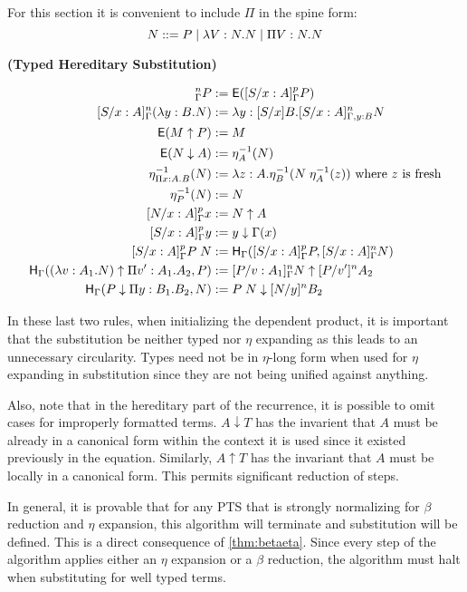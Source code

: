 For this section it is convenient to include $\Pi$ in the spine form: 
\[
N ::= P 
\; | \; \lambda V : N . N 
\; | \; \Pi V : N . N 
\]


\begin{definition}
\textbf{(Typed Hereditary Substitution)}

\begin{align}
[S / x : A]^n_{\Gamma } P &:= \m{E}([S / x : A]^p_{\Gamma } P)
\\
[S / x : A]^n_{\Gamma } (\lambda y : B . N) &:= \lambda y: [S / x ] B. [S / x : A]^n_{\Gamma, y : B} N
\\
\m{E}(M \uparrow P) &:= M
\\
\m{E}(N \downarrow A) &:= \eta^{-1}_A (N)
\\
\eta^{-1}_{\Pi x : A . B}(N) &:= \lambda z : A . \eta^{-1}_B(N \; \eta^{-1}_A(z))
 \text{ where $z$ is fresh}
\\
\eta^{-1}_{P}(N) &:= N
\\
[ N / x : A]^p_{\Gamma} x &:= N \uparrow A
\\
[S / x : A]^p_{\Gamma} y &:= y \downarrow \Gamma(x)
\\
[S / x : A]^p_{\Gamma } P\;N &:= 
\m{H}_{\Gamma} ( [S/x : A]^p_{\Gamma} P , [S/x : A]^n_{\Gamma} N) 
\\
\m{H}_{\Gamma} ((\lambda v : A_1 . N) \uparrow \Pi v' : A_1 . A_2 , P) 
&:= [P/v : A_1]^n_{\Gamma} N \uparrow [P/v']^n A_2
\\
\m{H}_{\Gamma}(P \downarrow \Pi y : B_1 . B_2 , N) &:= P\; N \downarrow [N/y]^nB_2
\end{align}

\label{def:tyhered}
\end{definition} 

In these last two rules, when initializing the dependent product, it is important that the substitution be neither typed
nor $\eta$ expanding as this leads to an unnecessary circularity.  Types need not be in $\eta$-long form
when used for $\eta$ expanding in substitution since they are not being unified against anything.

Also, note that in the hereditary part of the recurrence, 
it is possible to omit cases for improperly formatted terms.  $A \downarrow T$ has the invarient that
$A$ must be already in a canonical form within the context it is used since it existed previously in the
equation.  Similarly, $A \uparrow T$ has the invariant that $A$ must be locally in a canonical form.
This permits significant reduction of steps.

In general, it is provable that for any PTS that is strongly normalizing for $\beta$ reduction and 
$\eta$ expansion, this algorithm will terminate and substitution will be defined.  
This is a direct consequence of \ref{thm:betaeta}.  
Since every step of the algorithm applies either an $\eta$ expansion or 
a $\beta$ reduction, the algorithm must halt when substituting for well typed terms.

